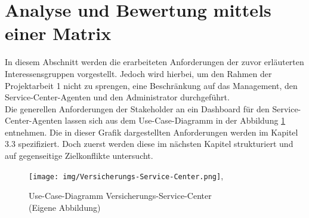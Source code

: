 \section{Analyse und Bewertung mittels einer Matrix}
In diesem Abschnitt werden die erarbeiteten Anforderungen der zuvor erläuterten Interessensgruppen vorgestellt. Jedoch wird hierbei, um den Rahmen der Projektarbeit 1 nicht zu sprengen, eine Beschränkung auf das Management, den Service-Center-Agenten und den Administrator durchgeführt.\\
Die generellen Anforderungen der Stakeholder an ein Dashboard für den Service-Center-Agenten lassen sich aus dem Use-Case-Diagramm in der Abbildung \ref{use-case-diagramm} entnehmen. Die in dieser Grafik dargestellten Anforderungen werden im Kapitel 3.3 spezifiziert. Doch zuerst werden diese im nächsten Kapitel strukturiert und auf gegenseitige Zielkonflikte untersucht.\\
\begin{figure}[h]
	\begin{center}
		\texttt{[image: img/Versicherungs-Service-Center.png]},
		\caption[Use-Case-Diagramm Versicherungs-Service-Center]
		{Use-Case-Diagramm Versicherungs-Service-Center \\(Eigene Abbildung)}
		\label{use-case-diagramm}
	\end{center}
\end{figure}
 
